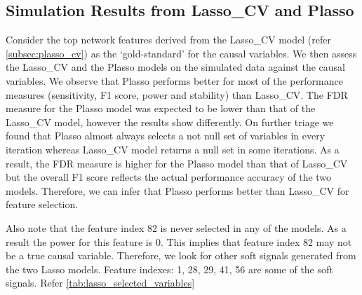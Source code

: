 \subsection{Simulation Results from Lasso\_CV and Plasso} \label{subsec:simstudy_plasso}
Consider the top network features derived from the Lasso\_CV model (refer \autoref{subsec:plasso_cv}) as the \lq gold-standard' for the causal variables. We then assess the Lasso\_CV and the Plasso models on the simulated data against the causal variables. We observe that Plasso performs better for most of the performance measures (sensitivity, F1 score, power and stability) than Lasso\_CV. The FDR measure for the Plasso model was expected to be lower than that of the Lasso\_CV model, however the results show differently. On further triage we found that Plasso almost always selects a not null set of variables in every iteration whereas Lasso\_CV model returns a null set in some iterations. As a result, the FDR measure is higher for the Plasso model than that of Lasso\_CV but the overall F1 score reflects the actual performance accuracy of the two models. Therefore, we can infer that Plasso performs better than Lasso\_CV for feature selection.\\ 
\begin{table}[H]
\caption{Performance measures of Lasso\_CV and Plasso models.}
\label{tab:lasso_sim_study}
\end{table}
Also note that the feature index 82 is never selected in any of the models. As a result the power for this feature is 0. This implies that feature index 82 may not be a true causal variable. Therefore, we look for other soft signals generated from the two Lasso models. Feature indexes: 1, 28, 29, 41, 56 are some of the soft signals. Refer \autoref{tab:lasso_selected_variables}\\
